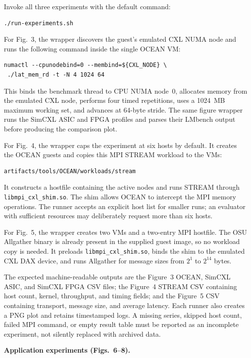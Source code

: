 \documentclass[conference]{IEEEtran}
\begin{document}
\artcomp

Invoke all three experiments with the default command:
\begin{verbatim}
./run-experiments.sh
\end{verbatim}

For Fig.~3, the wrapper discovers the guest's emulated CXL NUMA node and runs
the following command inside the single OCEAN VM:
\begin{verbatim}
numactl --cpunodebind=0 --membind=${CXL_NODE} \
 ./lat_mem_rd -t -N 4 1024 64
\end{verbatim}
This binds the benchmark thread to CPU NUMA node~0, allocates memory from the
emulated CXL node, performs four timed repetitions, uses a 1024~MB maximum
working set, and advances at 64-byte stride.  The same figure wrapper runs the
SimCXL ASIC and FPGA profiles and parses their LMbench output before producing
the comparison plot.

For Fig.~4, the wrapper caps the experiment at six hosts by default.  It
creates the OCEAN guests and copies this MPI STREAM workload to the VMs:
\begin{verbatim}
artifacts/tools/OCEAN/workloads/stream
\end{verbatim}
It constructs a hostfile containing the active nodes and runs STREAM through
\texttt{libmpi\_cxl\_shim.so}.  The shim allows OCEAN to intercept the MPI
memory operations.  The runner accepts an explicit host list for smaller
runs; an evaluator with sufficient resources may deliberately request more
than six hosts.

For Fig.~5, the wrapper creates two VMs and a two-entry MPI hostfile.  The OSU
Allgather binary is already present in the supplied guest image, so no
workload copy is needed.  It preloads \texttt{libmpi\_cxl\_shim.so}, binds the
shim to the emulated CXL DAX device, and runs Allgather for message sizes from
$2^1$ to $2^{14}$ bytes.

\artout

The expected machine-readable outputs are the Figure~3 OCEAN, SimCXL ASIC,
and SimCXL FPGA CSV files; the Figure~4 STREAM CSV containing host count,
kernel, throughput, and timing fields; and the Figure~5 CSV containing
transport, message size, and average latency.  Each runner also creates a PNG
plot and retains timestamped logs.  A missing series, skipped host count,
failed MPI command, or empty result table must be reported as an incomplete
experiment, not silently replaced with archived data.

\noindent\textbf{Application experiments (Figs.~6--8).}
\end{document}
